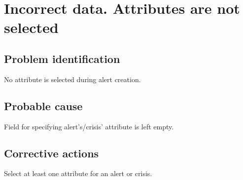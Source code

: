 \section{Incorrect data. Attributes are not selected}

\subsection{Problem identification}
No attribute is selected during alert creation. 

\subsection{Probable cause}
Field for specifying alert's/crisis' attribute is left empty.

\subsection{Corrective actions}
Select at least one attribute for an alert or crisis.